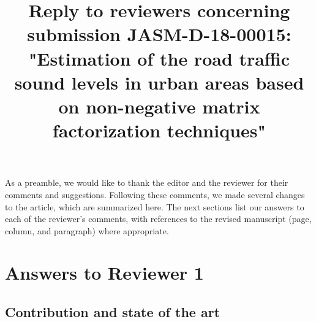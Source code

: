 \documentclass[10pt]{article}
\title{Reply to reviewers concerning submission JASM-D-18-00015: "Estimation of the road traffic sound levels in urban areas based on non-negative matrix factorization techniques"}
\begin{document}
\maketitle

As a preamble, we would like to thank the editor and the reviewer for their comments and suggestions. Following these comments, we made several changes to the article, which are summarized here. The next sections list our answers to each of the reviewer’s comments, with references to the revised manuscript (page, column, and paragraph) where appropriate.

\section{Answers to Reviewer 1}
\subsection{Contribution and state of the art}
\end{document}

